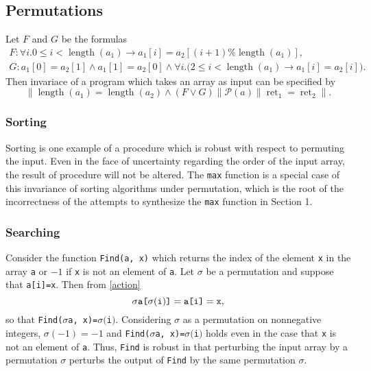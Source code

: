 \documentclass{llncs}
\DeclareMathOperator{\Perm}{Perm}
\DeclareMathOperator{\len}{length}
\DeclareMathOperator{\ret}{ret}
\begin{document}
\subsection{Permutations}


Let \(F\) and \(G\) be the formulas
\begin{gather*}
    F:  \forall i. 0 \leq i < \len(a_{1}) \rightarrow a_{1}[i] = a_{2}[(i+1)\%\len(a_{1})],\\
        G: a_{1}[0] = a_{2}[1] \wedge a_{1}[1] = a_{2}[0] \wedge \forall i.\big( 2 \leq i < \len(a_{1}) \rightarrow a_{1}[i] = a_{2}[i] \big).
\end{gather*}
Then invariace of a program which takes an array as input can be specified by
\[\|\len(a_{1}) = \len(a_{2}) \wedge (F \vee G)\| \mathcal{P}(a) \|\ret_{1} = \ret_{2}\|.\]

\subsubsection{Sorting}

Sorting is one example of a procedure which is robust with respect to permuting the input.  Even in the face of uncertainty regarding the order of the input array, the result of procedure will not be altered.  The \verb!max! function is a special case of this invariance of sorting algorithms under permutation, which is the root of the incorrectness of the attempts to synthesize the \verb!max! function in Section 1.

\subsubsection{Searching}

Consider the function \verb!Find(a, x)! which returns the index of the element \verb!x! in the array \verb!a! or \(-1\) if \verb!x! is not an element of \verb!a!.  Let \(\sigma\) be a permutation and suppose that \verb!a[i]=x!.  Then from \eqref{action}
\[\sigma\verb!a[!\sigma(\verb!i!)\verb!]! = \verb!a[i]! = \verb!x!,\]
so that \verb!Find(!\(\sigma\)\verb!a, x)=!\(\sigma(\)\verb!i!\()\).  Considering \(\sigma\) as a permutation on nonnegative integers, \(\sigma(-1) = -1\) and \verb!Find(!\(\sigma\)\verb!a, x)=!\(\sigma(\)\verb!i!\()\) holds even in the case that \verb!x! is not an element of \verb!a!.  Thus, \verb!Find! is robust in that perturbing the input array by a permutation \(\sigma\) perturbs the output of \verb!Find! by the same permutation \(\sigma\).
\end{document}
